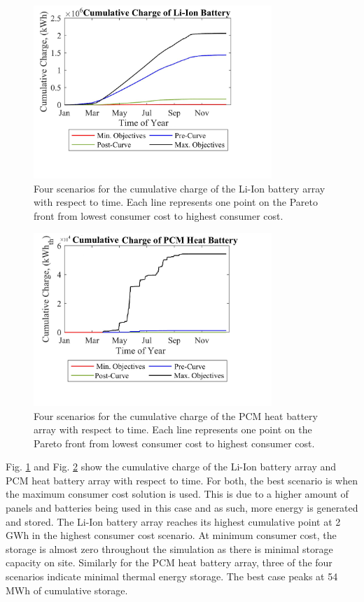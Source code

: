 \begin{figure}[H]
	\centering
    \includegraphics[width=255pt]{Figures/CumChargeBat.png}
    \vspace*{-15mm}
    \caption{Four scenarios for the cumulative charge of the Li-Ion battery array with respect to time. Each line represents one point on the Pareto front from lowest consumer cost to highest consumer cost.}
    \label{fig:CumChargeBat}
\end{figure}
 
 \begin{figure}[H]
	\centering
    \includegraphics[width=255pt]{Figures/CumChargeHBat.png}
    \vspace*{-15mm}
    \caption{Four scenarios for the cumulative charge of the PCM heat battery array with respect to time. Each line represents one point on the Pareto front from lowest consumer cost to highest consumer cost.}
    \label{fig:CumChargeHBat}
\end{figure}

Fig. \ref{fig:CumChargeBat} and Fig. \ref{fig:CumChargeHBat} show the cumulative charge of the Li-Ion battery array and PCM heat battery array with respect to time. For both, the best scenario is when the maximum consumer cost solution is used. This is due to a higher amount of panels and batteries being used in this case and as such, more energy is generated and stored. The Li-Ion battery array reaches its highest cumulative point at 2 GWh in the highest consumer cost scenario. At minimum consumer cost, the storage is almost zero throughout the simulation as there is minimal storage capacity on site. Similarly for the PCM heat battery array, three of the four scenarios indicate minimal thermal energy storage. The best case peaks at 54 MWh of cumulative storage.


